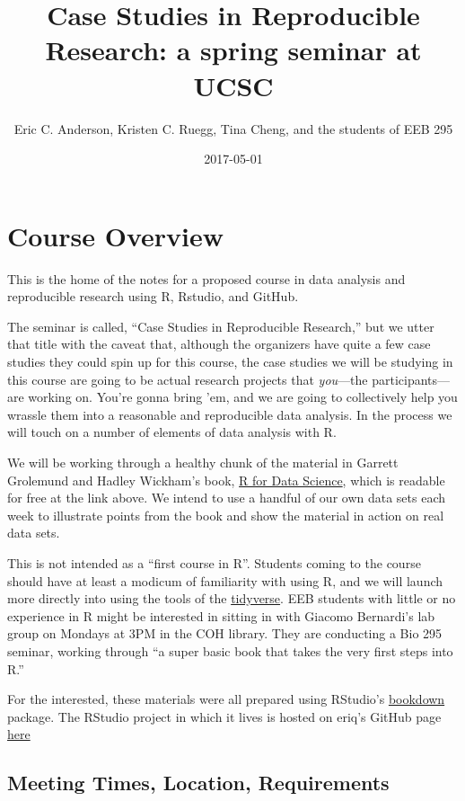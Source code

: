 \documentclass[]{book}
\title{Case Studies in Reproducible Research: a spring seminar at UCSC}
\author{Eric C. Anderson, Kristen C. Ruegg, Tina Cheng, and the students of EEB
295}
\date{2017-05-01}
\theoremstyle{definition}
\theoremstyle{definition}
\theoremstyle{remark}
\begin{document}
\maketitle

{
\setcounter{tocdepth}{1}
\tableofcontents
}
\chapter{Course Overview}\label{course-overview}

This is the home of the notes for a proposed course in data analysis and
reproducible research using R, Rstudio, and GitHub.

The seminar is called, ``Case Studies in Reproducible Research,'' but we
utter that title with the caveat that, although the organizers have
quite a few case studies they could spin up for this course, the case
studies we will be studying in this course are going to be actual
research projects that \emph{you}---the participants---are working on.
You're gonna bring 'em, and we are going to collectively help you
wrassle them into a reasonable and reproducible data analysis. In the
process we will touch on a number of elements of data analysis with R.

We will be working through a healthy chunk of the material in Garrett
Grolemund and Hadley Wickham's book, \href{http://r4ds.had.co.nz/}{R for
Data Science}, which is readable for free at the link above. We intend
to use a handful of our own data sets each week to illustrate points
from the book and show the material in action on real data sets.

This is not intended as a ``first course in R''. Students coming to the
course should have at least a modicum of familiarity with using R, and
we will launch more directly into using the tools of the
\href{http://tidyverse.org/}{tidyverse}. EEB students with little or no
experience in R might be interested in sitting in with Giacomo
Bernardi's lab group on Mondays at 3PM in the COH library. They are
conducting a Bio 295 seminar, working through ``a super basic book that
takes the very first steps into R.''

For the interested, these materials were all prepared using RStudio's
\href{https://bookdown.org/}{bookdown} package. The RStudio project in
which it lives is hosted on eriq's GitHub page
\href{https://github.com/eriqande/rep-res-eeb-2017}{here}

\section{Meeting Times, Location,
Requirements}\label{meeting-times-location-requirements}
\end{document}
